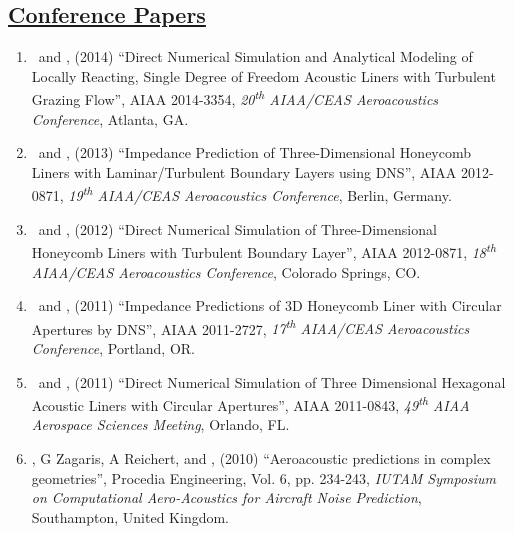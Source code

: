 \documentclass[11pt,letter]{article}
\begin{document}
\subsection*{\textbf{\underline{Conference Papers}}}
\begin{enumerate}
\item \QZ\ and \DJB,  (2014) {``Direct Numerical Simulation and Analytical Modeling of Locally Reacting, Single Degree of Freedom Acoustic Liners with Turbulent Grazing Flow''}, AIAA 2014-3354, \emph{20\textsuperscript{th}  AIAA/CEAS Aeroacoustics Conference}, Atlanta, GA.
\item \QZ\ and \DJB,  (2013) {``Impedance Prediction of Three-Dimensional Honeycomb Liners with Laminar/Turbulent Boundary Layers using DNS''}, AIAA 2012-0871, \emph{19\textsuperscript{th}  AIAA/CEAS Aeroacoustics Conference}, Berlin, Germany.
\item \QZ\ and \DJB,  (2012) {``Direct Numerical Simulation of Three-Dimensional Honeycomb Liners with Turbulent Boundary Layer''}, AIAA 2012-0871, \emph{18\textsuperscript{th}  AIAA/CEAS Aeroacoustics Conference}, Colorado Springs, CO.
\item \QZ\ and \DJB,  (2011) {``Impedance Predictions of 3D Honeycomb Liner with Circular Apertures by DNS''}, AIAA 2011-2727,   \emph{17\textsuperscript{th} AIAA/CEAS Aeroacoustics Conference}, Portland, OR.
\item \QZ\ and  \DJB,  (2011) {``Direct Numerical Simulation of Three Dimensional Hexagonal Acoustic Liners with Circular Apertures''}, AIAA 2011-0843, \emph{49\textsuperscript{th}  AIAA Aerospace Sciences Meeting}, Orlando, FL.
\item \DJB, G Zagaris, A Reichert, and  \QZ, (2010) {``Aeroacoustic predictions in complex geometries''}, Procedia Engineering, Vol. 6, pp. 234-243, \emph{IUTAM Symposium on Computational Aero-Acoustics for Aircraft Noise Prediction}, Southampton, United Kingdom.
\end{enumerate}

\end{document}
